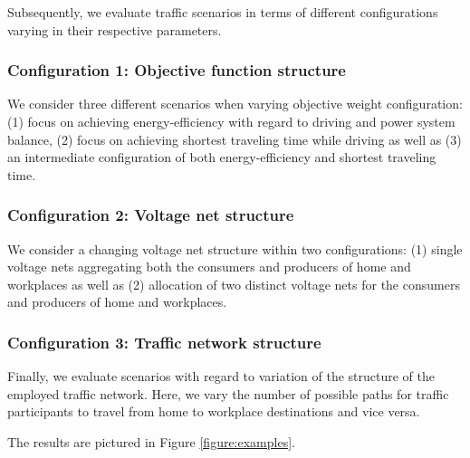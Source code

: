 Subsequently, we evaluate traffic scenarios in terms of different configurations varying in their respective parameters. 

\subsubsection{Configuration 1: Objective function structure}

We consider three different scenarios when varying objective weight configuration: (1) focus on achieving energy-efficiency with regard to driving and power system balance, (2) focus on achieving shortest traveling time while driving as well as (3) an intermediate configuration of both energy-efficiency and shortest traveling time.

\subsubsection{Configuration 2: Voltage net structure}

We consider a changing voltage net structure within two configurations: (1) single voltage nets aggregating both the consumers and producers of home and workplaces as well as (2) allocation of two distinct voltage nets for the consumers and producers of home and workplaces. 

\subsubsection{Configuration 3: Traffic network structure}

Finally, we evaluate scenarios with regard to variation of the structure of the employed traffic network. Here, we vary the number of possible paths for traffic participants to travel from home to workplace destinations and vice versa.  

The results are pictured in Figure \ref{figure:examples}. 

